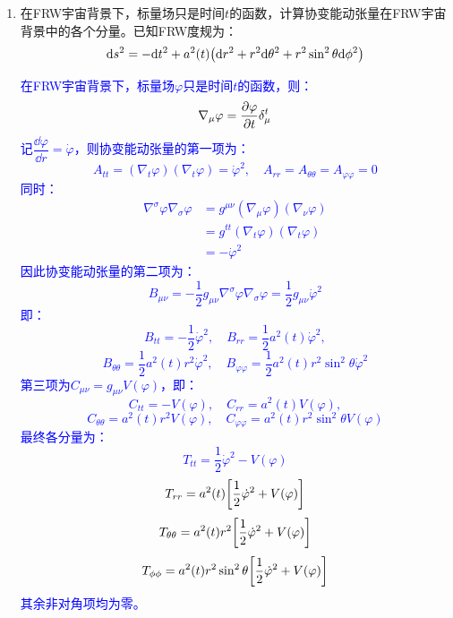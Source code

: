 \documentclass[a4paper]{article}
\begin{document}
\begin{enumerate}
    \item 在FRW宇宙背景下，标量场只是时间$t$的函数，计算协变能动张量在FRW宇宙背景中的各个分量。已知FRW度规为：
    \[
        \dd s^2 = -\dd t^2 + a^2(t) \qty(\dd r^2 + r^2 \dd \theta^2 + r^2 \sin^2\theta \dd \phi^2)
    \]

    \textcolor{blue}{
    在FRW宇宙背景下，标量场$\varphi$只是时间$t$的函数，则：
    \[
        \nabla_\mu \varphi = \pdv{\varphi}{t} \delta^t_{\mu}
    \]
    记$\dfrac{\dd\varphi}{\dd r} = \dot{\varphi}$，则协变能动张量的第一项为：
    \[
        A_{tt} = (\nabla_t \varphi)(\nabla_t \varphi) = \dot{\varphi}^2,\quad A_{rr} = A_{\theta\theta} = A_{\varphi\varphi} = 0
    \]
    同时：
    \begin{align*}
        \nabla^\sigma \varphi \nabla_\sigma \varphi
        & = g^{\mu\nu} (\nabla_\mu \varphi)(\nabla_\nu \varphi) \\
        & = g^{tt} (\nabla_t \varphi)(\nabla_t \varphi) \\
        & = -\dot{\varphi}^2
    \end{align*}
    因此协变能动张量的第二项为：
    \[
        B_{\mu\nu} = -\frac{1}{2} g_{\mu\nu} \nabla^\sigma \varphi \nabla_\sigma \varphi = \frac{1}{2} g_{\mu\nu} \dot{\varphi}^2
    \]
    即：
    \[
        B_{tt} = -\frac{1}{2} \dot{\varphi}^2,\quad B_{rr} = \frac{1}{2} a^2(t) \dot{\varphi}^2,
    \]
    \[
        B_{\theta\theta} = \frac{1}{2} a^2(t) r^2 \dot{\varphi}^2,\quad B_{\varphi\varphi} = \frac{1}{2} a^2(t) r^2 \sin^2\theta \dot{\varphi}^2
    \]
    第三项为$C_{\mu\nu} = g_{\mu\nu} V(\varphi)$，即：
    \[
        C_{tt} = -V(\varphi),\quad C_{rr} = a^2(t) V(\varphi),
    \]
    \[
        C_{\theta\theta} = a^2(t) r^2 V(\varphi),\quad C_{\varphi\varphi} = a^2(t) r^2 \sin^2\theta V(\varphi)
    \]
    最终各分量为：
    \[
        T_{tt} = \frac{1}{2} \dot{\varphi}^2 - V(\varphi)
    \]
    \[
        T_{rr} = a^2(t) \qty[\frac{1}{2} \dot{\varphi}^2 + V(\varphi)]
    \]
    \[
        T_{\theta\theta} = a^2(t) r^2 \qty[\frac{1}{2} \dot{\varphi}^2 + V(\varphi)]
    \]
    \[
        T_{\phi\phi} = a^2(t) r^2 \sin^2\theta \qty[\frac{1}{2} \dot{\varphi}^2 + V(\varphi)]
    \]
    其余非对角项均为零。
    }

\end{enumerate}
\end{document}
